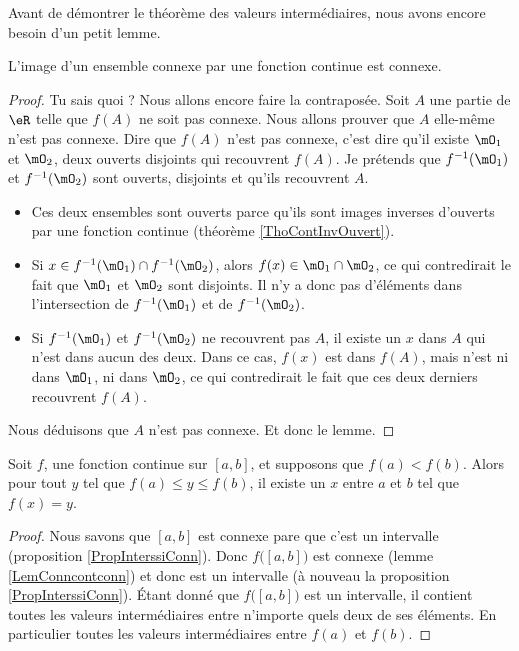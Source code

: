 \documentclass{article}
\begin{document}
Avant de démontrer le théorème des valeurs intermédiaires, nous avons encore besoin d'un petit lemme.
\begin{lemma}	\label{LemConncontconn}
L'image d'un ensemble connexe par une fonction continue est connexe.
\end{lemma}

\begin{proof}
Tu sais quoi ? Nous allons encore faire la contraposée. Soit $A$ une partie de $\eR$ telle que $f(A)$ ne soit pas connexe. Nous allons prouver que $A$ elle-même n'est pas connexe. Dire que $f(A)$ n'est pas connexe, c'est dire qu'il existe $\mO_1$ et $\mO_2$, deux ouverts disjoints qui recouvrent $f(A)$. Je prétends que $f^{-1}(\mO_1)$ et $f^{-1}(\mO_2)$ sont ouverts, disjoints et qu'ils recouvrent $A$.
\begin{itemize}
\item Ces deux ensembles sont ouverts parce qu'ils sont images inverses d'ouverts par une fonction continue (théorème \ref{ThoContInvOuvert}).
\item Si $x\in f^{-1}(\mO_1)\cap f^{-1}(\mO_2)$, alors $f(x)\in \mO_1\cap\mO_2$, ce qui contredirait le fait que $\mO_1$ et $\mO_2$ sont disjoints. Il n'y a donc pas d'éléments dans l'intersection de $f^{-1}(\mO_1)$ et de $f^{-1}(\mO_2)$.
\item Si $f^{-1}(\mO_1)$ et $f^{-1}(\mO_2)$ ne recouvrent pas $A$, il existe un $x$ dans $A$ qui n'est dans aucun des deux. Dans ce cas, $f(x)$ est dans $f(A)$, mais n'est ni dans $\mO_1$, ni dans $\mO_2$, ce qui contredirait le fait que ces deux derniers recouvrent $f(A)$.
\end{itemize}
Nous déduisons que $A$ n'est pas connexe. Et donc le lemme.
\end{proof}

\begin{theorem}		\label{ThoValInter}
Soit $f$, une fonction continue sur $[a,b]$, et supposons que $f(a)<f(b)$. Alors pour tout $y$ tel que $f(a)\leq y\leq f(b)$, il existe un $x$ entre $a$ et $b$ tel que $f(x)=y$.
\end{theorem}

\begin{proof}
Nous savons que $[a,b]$ est connexe pare que c'est un intervalle (proposition \ref{PropInterssiConn}). Donc $f\big( [a,b] \big)$ est connexe (lemme \ref{LemConncontconn}) et donc est un intervalle (à nouveau la proposition \ref{PropInterssiConn}). Étant donné que $f\big( [a,b] \big)$ est un intervalle, il contient toutes les valeurs intermédiaires entre n'importe quels deux de ses éléments. En particulier toutes les valeurs intermédiaires entre $f(a)$ et $f(b)$.
\end{proof}
\end{document}
